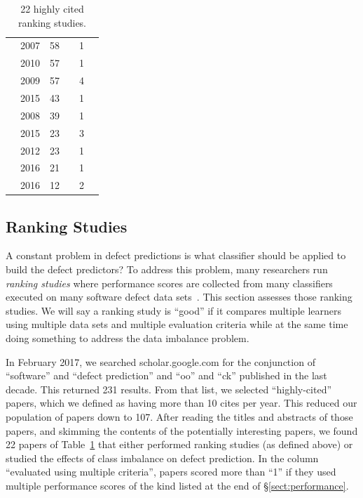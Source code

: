 \documentclass[10pt,conference]{IEEEtran}
\newcommand{\cmark}{\ding{51}}%
\newcommand{\xmark}{\ding{55}}%
\theoremstyle{break}
\theoremstyle{break}
\newcommand{\tion}[1]{{\S}\ref{sect:#1}}
\begin{document}
\begin{table}[!t]
\begin{tabular}{c@{~}|c@{~}|c@{~}|c@{~}|c@{~}|c@{~}}
        \cite{pelayo2007applying} & 2007 & 58 & \xmark & 1 & \cmark \\  
        \cite{khoshgoftaar2010attribute} & 2010 & 57 & \cmark & 1 & \cmark  \\  
        \cite{jiang2009variance} & 2009 & 57 & \cmark & 4 & \xmark  \\  
        \cite{ghotra2015revisiting} & 2015 & 43 & \cmark & 1 & \xmark  \\  
        \cite{jiang2008can} & 2008 & 39 & \cmark & 1 & \cmark  \\  
        \cite{tan2015online} & 2015 & 23 & \xmark & 3 & \cmark \\  
        \cite{pelayo2012evaluating} & 2012 & 23 & \xmark & 1 & \cmark \\  
        \cite{tantithamthavorn2016automated} & 2016 & 21 & \cmark & 1 & \xmark\\  
        \cite{fu2016tuning} & 2016 & 12 & \cmark & 2 & \xmark  \\    
\end{tabular}
\caption{22 highly cited ranking studies.}
\label{tbl:survey2}
\vspace{-0.5cm}
\end{table}

\subsection{Ranking Studies}
\label{sect:rank}

A constant problem in defect predictions is what  classifier should be applied to  build  the  defect  predictors?
To address this problem, many researchers run {\em ranking studies} where  performance scores 
are collected from  many classifiers  executed on  many software defect data sets~\cite{lessmann2008benchmarking,hall2012systematic,elish2008predicting,menzies2010defect,gondra2008applying,radjenovic2013software,jiang2008techniques,wang2013using,mende2009revisiting,li2012sample,khoshgoftaar2010attribute,jiang2009variance,ghotra2015revisiting,jiang2008can,tantithamthavorn2016automated,fu2016tuning}.
This section assesses those ranking studies. We will say a ranking study is ``good'' if it compares multiple learners using multiple data sets and multiple evaluation criteria
while at the same time doing something to address the data imbalance problem.

 In February  2017,  we searched
scholar.google.com for the conjunction of ``software'' and ``defect prediction'' and ``oo'' and ``ck'' published in the last decade. This returned 231 results.
From that list, we selected ``highly-cited'' papers, which we defined as having more than 10 cites per year.  This reduced our population of papers down to 107.
After reading the titles and abstracts of those papers, and skimming the contents of the potentially interesting papers, we found 22 papers of Table~\ref{tbl:survey2} that either performed ranking studies
(as defined above) or studied the effects of class imbalance on defect prediction. In the column ``evaluated using
multiple criteria'',
papers scored more than ``1'' if they used multiple performance scores  of the kind listed at the end of \tion{performance}. 
\end{document}
